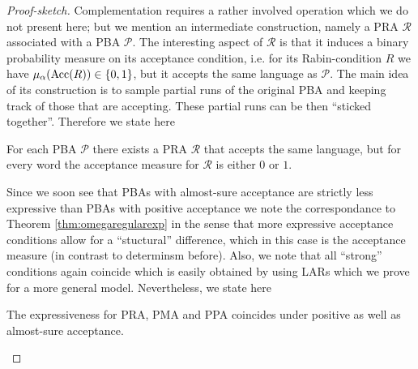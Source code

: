 \begin{proof}[Proof-sketch]
  Complementation requires a rather involved operation which we do not present 
  here; but we mention an intermediate construction, namely a \ac{PRA} 
  $\mathcal{R}$ associated with a \ac{PBA} $\mathcal{P}$. The 
  interesting aspect of $\mathcal{R}$ is that it induces a binary probability 
  measure on its acceptance condition, i.e. for its Rabin-condition $R$ we have
  $\mu_{\alpha}(\operatorname{Acc}(R))\in\left\{0,1\right\}$, but it accepts the same language as
  $\mathcal{P}$. The main idea of its construction is to sample partial runs of 
  the original \ac{PBA} and keeping track of those that are accepting. These 
  partial runs can be then \enquote{sticked together}. Therefore we state here
  \begin{theorem}
    \cite[Theorem 4.3.2]{Groesser}
    For each \ac{PBA} $\mathcal{P}$ there exists a \ac{PRA} $\mathcal{R}$ that 
    accepts the same language, but for every word the acceptance measure for
    $\mathcal{R}$ is either $0$ or $1$.
    \label{thm:pbatopra}
  \end{theorem}
  Since we soon see that \acp{PBA} with almost-sure acceptance are strictly
  less expressive than \acp{PBA} with positive acceptance we note the 
  correspondance to Theorem \ref{thm:omegaregularexp} in the
  sense that more expressive acceptance conditions allow for a 
  \enquote{stuctural} difference, which in this case is the acceptance measure
  (in contrast to determinsm before). Also, we note that all \enquote{strong}
  conditions again coincide which is easily obtained by using \acp{LAR} which
  we prove for a more general model. Nevertheless, we state here
  \begin{theorem}
    The expressiveness for \ac{PRA}, \ac{PMA} and \ac{PPA} coincides under
    positive as well as almost-sure acceptance.
    \label{thm:probautoequiv}
  \end{theorem}
\end{proof}

